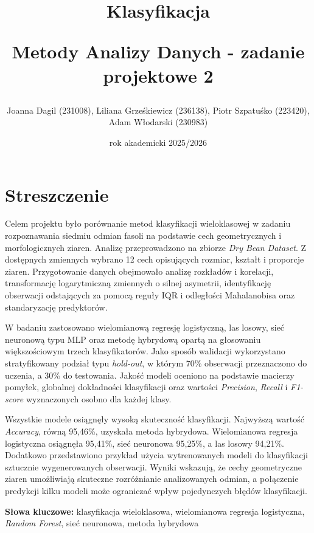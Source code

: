 \documentclass{report}
\title{\LARGE{Klasyfikacja}

\vspace{0.3cm}

\Large{Metody Analizy Danych - zadanie projektowe 2}}
\author{
Joanna Dagil (231008),
Liliana Grześkiewicz (236138),
Piotr Szpatuśko (223420),
Adam Włodarski (230983)
}
\date{rok akademicki 2025/2026}
\begin{document}
\maketitle

\tableofcontents

\chapter*{Streszczenie}

Celem projektu było porównanie metod klasyfikacji wieloklasowej w zadaniu rozpoznawania siedmiu odmian fasoli na podstawie cech geometrycznych i morfologicznych ziaren. Analizę przeprowadzono na zbiorze \textit{Dry Bean Dataset}. Z dostępnych zmiennych wybrano 12 cech opisujących rozmiar, kształt i proporcje ziaren. Przygotowanie danych obejmowało analizę rozkładów i korelacji, transformację logarytmiczną zmiennych o silnej asymetrii, identyfikację obserwacji odstających za pomocą reguły IQR i odległości Mahalanobisa oraz standaryzację predyktorów.

W badaniu zastosowano wielomianową regresję logistyczną, las losowy, sieć neuronową typu MLP oraz metodę hybrydową opartą na głosowaniu większościowym trzech klasyfikatorów. Jako sposób walidacji wykorzystano stratyfikowany podział typu \textit{hold-out}, w którym 70\% obserwacji przeznaczono do uczenia, a 30\% do testowania. Jakość modeli oceniono na podstawie macierzy pomyłek, globalnej dokładności klasyfikacji oraz wartości \textit{Precision}, \textit{Recall} i \textit{F1-score} wyznaczonych osobno dla każdej klasy.

Wszystkie modele osiągnęły wysoką skuteczność klasyfikacji. Najwyższą wartość \textit{Accuracy}, równą 95{,}46\%, uzyskała metoda hybrydowa. Wielomianowa regresja logistyczna osiągnęła 95{,}41\%, sieć neuronowa 95{,}25\%, a las losowy 94{,}21\%. Dodatkowo przedstawiono przykład użycia wytrenowanych modeli do klasyfikacji sztucznie wygenerowanych obserwacji. Wyniki wskazują, że cechy geometryczne ziaren umożliwiają skuteczne rozróżnianie analizowanych odmian, a połączenie predykcji kilku modeli może ograniczać wpływ pojedynczych błędów klasyfikacji.

\vspace{0.5cm}
\noindent\textbf{Słowa kluczowe:} klasyfikacja wieloklasowa, wielomianowa regresja logistyczna, \textit{Random Forest}, sieć neuronowa, metoda hybrydowa


\end{document}
